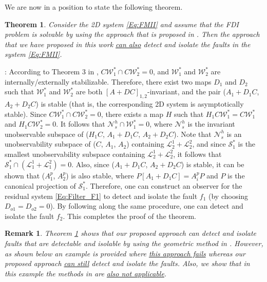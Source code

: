 \documentclass[journal,12pt,draftcls,onecolumn]{IEEEtran}
\newcommand{\ssp}[1]{\mathscr{#1}}      \newcommand{\setssp}[1]{\mathfrak{#1}}   \newcommand{\fld}[1]{\mathbb{#1}}       \newcommand{\op}[1]{\mathcal{#1}}       \newcommand{\sumbanach}[1]{\sum{#1}}
\def\QEDclosed{\hfill\IEEEQEDclosed}
\renewcommand{\qed}{\QEDclosed}
\renewenvironment{proof}[1][\proofname]{\noindent\nobreakspace{\bfseries #1}:\;}{\qed\par}
\newtheorem{theorem}{Theorem}
\newtheorem{remark}{Remark}
\begin{document}
We are now in a position to state the following theorem.
\begin{theorem}\label{Thm:Our_Maleki}
	Consider the 2D system \eqref{Eq:FMII} and assume that the FDI problem is solvable by using the approach that is proposed in \cite{Malek_3DFDI}. Then the approach that we have proposed in this work \underline{can also} detect and isolate the faults in the system \eqref{Eq:FMII}.
\end{theorem}
\begin{proof}
	According to Theorem 3 in \cite{Malek_3DFDI}, $C\ssp{W}^*_1\cap C\ssp{W}^*_2=0$, and  $\ssp{W}^*_1$ and $\ssp{W}^*_2$ are internally/externally stabilizable.  Therefore, there exist two maps $D_1$ and $D_2$ such that $\ssp{W}_1^*$ and $\ssp{W}_2^*$ are both  $[A+DC]_{1,2}$-invariant, and the pair ($A_1+D_1C$, $A_2+D_2C$) is stable (that is, the corresponding 2D system is asymptotically stable). Since $C\ssp{W}^*_1\cap C\ssp{W}^*_2=0$, there exists a map $H$ such that $H_1C\ssp{W}^*_1 = C\ssp{W}^*_1$ and $H_1C\ssp{W}^*_2 = 0$. It follows that $\ssp{N}_s^h\cap\ssp{W}^*_1=0$, where $\ssp{N}_s^h$ is the invariant unobservable subspace of ($H_1C$, $A_1+D_1C$, $A_2+D_2C$). Note that $\ssp{N}_s^h$ is an unobservability subspace of ($C$, $A_1$, $A_2$) containing  $\ssp{L}_2^1+\ssp{L}_2^2$, and since $\op{S}_1^*$ is the smallest unobservability subspace containing $\ssp{L}_2^1+\ssp{L}_2^2$, it follows that $\op{S}_1^*\cap(\ssp{L}_1^1+\ssp{L}_1^2)=0$.
	Also, since  ($A_1+D_1C$, $A_2+D_2C$) is stable, it can be shown that ($A_1^p$, $A_2^p$) is also stable, where $P[A_1+D_1C]=A_i^pP$ and $P$ is the canonical projection of $\op{S}_1^*$. Therefore, one can construct an observer for the residual system \eqref{Eq:Filter_F1} to detect and isolate the fault $f_1$ (by choosing $D_{o1}=D_{o2}=0$). By following along the same procedure, one can detect and isolate the fault $f_2$. This completes the proof of the theorem.
\end{proof}

\begin{remark}\label{Rem:Our_Others}
	Theorem \ref{Thm:Our_Maleki} shows that our proposed approach can detect and isolate faults that are detectable and isolable by using the geometric method in \cite{Malek_3DFDI}.
	However, as shown below an example is provided where \underline{this approach fails} whereas our proposed approach \underline{can still} detect and isolate the faults. Also, we show that in this example the methods in \cite{BisiaccoMultiDim,BisiaccoLetter} are \underline{also not applicable}.
\end{remark}
\end{document}
